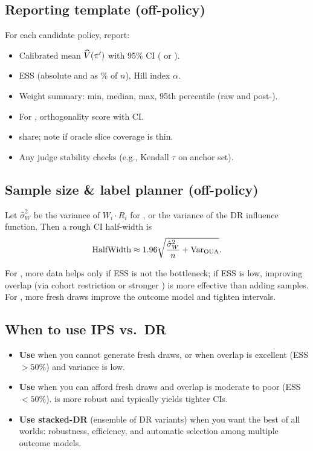 \subsection{Reporting template (off-policy)}

For each candidate policy, report:

\begin{itemize}
\item Calibrated mean $\widehat{V}(\pi')$ with 95\% CI (\ips{} or \dr).
\item ESS (absolute and as \% of $n$), Hill index $\alpha$.
\item Weight summary: min, median, max, 95th percentile (raw and post-\simcal).
\item For \dr, orthogonality score with CI.
\item \oua{} share; note if oracle slice coverage is thin.
\item Any judge stability checks (e.g., Kendall $\tau$ on anchor set).
\end{itemize}

\subsection{Sample size \& label planner (off-policy)}

Let $\hat{\sigma}_W^2$ be the variance of $W_i \cdot R_i$ for \ips, or the variance of the DR influence function. Then a rough CI half-width is
\begin{equation}
\text{HalfWidth} \approx 1.96 \sqrt{\frac{\hat{\sigma}_W^2}{n} + \operatorname{Var}_{\text{OUA}}}.
\end{equation}

For \ips, more data helps only if ESS is not the bottleneck; if ESS is low, improving overlap (via cohort restriction or stronger \simcal) is more effective than adding samples. For \dr, more fresh draws improve the outcome model and tighten intervals.

\subsection{When to use IPS vs.\ DR}

\begin{itemize}
\item \textbf{Use \ips{}} when you cannot generate fresh draws, or when overlap is excellent (ESS $> 50\%$) and variance is low.
\item \textbf{Use \dr{}} when you can afford fresh draws and overlap is moderate to poor (ESS $< 50\%$). \dr{} is more robust and typically yields tighter CIs.
\item \textbf{Use stacked-DR} (ensemble of DR variants) when you want the best of all worlds: robustness, efficiency, and automatic selection among multiple outcome models.
\end{itemize}


